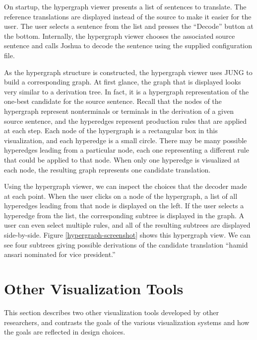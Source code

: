 \documentclass[nologo]{pbml}
\begin{document}
On startup, the hypergraph viewer presents a list of sentences to translate.
The reference translations are displayed instead of the source to make it easier for the user. The user selects a sentence from the list and presses the ``Decode'' button at the bottom. Internally, the hypergraph viewer chooses the associated source sentence and calls Joshua to decode the sentence using the supplied
configuration file.

As the hypergraph structure is constructed, the
hypergraph viewer uses JUNG to build a corresponding graph. At first glance,
the graph that is displayed looks very similar to a derivation tree. In fact,
it is a hypergraph representation of the one-best candidate for the source
sentence.
Recall that the nodes of the hypergraph represent nonterminals or terminals in
the derivation of a given source sentence, and the hyperedges represent
production rules that are applied at each step.
Each node of the hypergraph is a rectangular box in this visualization, and
each hyperedge is a small circle. There may be many possible hyperedges leading
from a particular node, each one representing a different rule that could
be applied to that node. When only one hyperedge is visualized at each node,
the resulting graph represents one candidate translation.

Using the hypergraph viewer, we can inspect the choices that the decoder made
at each point. When the user clicks on a node of the hypergraph, a list of all
hyperedges leading from that node is displayed on the left. If the user selects
a hyperedge from the list, the corresponding subtree is displayed in the graph.
A user can even select multiple rules, and all of the resulting subtrees are
displayed side-by-side.
Figure \ref{hypergraph-screenshot} shows this hypergraph view.
We can see four subtrees giving possible derivations of the 
candidate translation
``hamid ansari nominated for vice president.''

\section{Other Visualization Tools}

This section describes two other visualization tools developed by other
researchers, and contrasts the goals of the various visualization systems and
how the goals are reflected in design choices.
\end{document}
